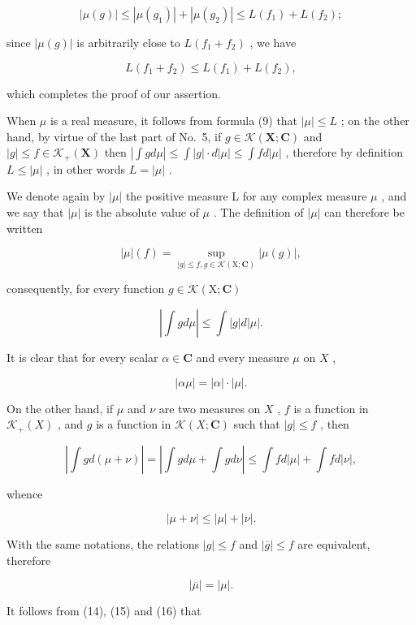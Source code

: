 \[
| \mu (g) | \leqslant | \mu (g _ {1}) | + | \mu (g _ {2}) | \leqslant L (f _ {1}) + L (f _ {2});
\]

since \(|\mu(g)|\) is arbitrarily close to \(L(f_1 + f_2)\) , we have

\[
L (f _ {1} + f _ {2}) \leqslant L (f _ {1}) + L (f _ {2}),
\]

which completes the proof of our assertion.

When \(\mu\) is a real measure, it follows from formula (9) that \(|\mu| \leqslant L\) ; on the other hand, by virtue of the last part of No.~5, if \(g \in \mathcal{K}(\mathbf{X}; \mathbf{C})\) and \(|g| \leqslant f \in \mathcal{K}_{+}(\mathbf{X})\) then \(|\int g d\mu| \leqslant \int |g| \cdot d|\mu| \leqslant \int f d|\mu|\) , therefore by definition \(L \leqslant |\mu|\) , in other words \(L = |\mu|\) .

We denote again by \(|\mu|\) the positive measure L for any complex measure \(\mu\) , and we say that \(|\mu|\) is the absolute value of \(\mu\) . The definition of \(|\mu|\) can therefore be written

\[
| \mu | (f) = \sup _ {| g | \leqslant f, g \in \mathcal{K} (\mathrm{X}; \mathbf {C})} | \mu (g) |,\tag{12}
\]

consequently, for every function \(g \in \mathcal{K}(\mathrm{X};\mathbf{C})\)

\[
\left| \int g d \mu \right| \leqslant \int | g | d | \mu |.\tag{13}
\]

It is clear that for every scalar \(\alpha \in \mathbf{C}\) and every measure \(\mu\) on \(X\) ,

\[
| \alpha \mu | = | \alpha | \cdot | \mu |.\tag{14}
\]

On the other hand, if \(\mu\) and \(\nu\) are two measures on \(X\) , \(f\) is a function in \(\mathcal{K}_{+}(X)\) , and \(g\) is a function in \(\mathcal{K}(X; \mathbf{C})\) such that \(|g| \leqslant f\) , then

\[
\left| \int g d (\mu + \nu) \right| = \left| \int g d \mu + \int g d \nu \right| \leqslant \int f d | \mu | + \int f d | \nu |,
\]

whence

\[
| \mu + \nu | \leqslant | \mu | + | \nu |.\tag{15}
\]

With the same notations, the relations \(|g| \leqslant f\) and \(|\overline{g}| \leqslant f\) are equivalent, therefore

\[
| \overline {{{\mu}}} | = | \mu |.\tag{16}
\]

It follows from (14), (15) and (16) that

